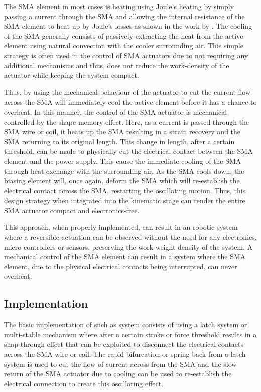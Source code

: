 The SMA element in most cases is heating using Joule's heating by simply passing a current through the SMA and allowing the internal resistance of the SMA element to heat up by Joule's losses as shown in the work by \todocite. The cooling of the SMA generally consists of passively extracting the heat from the active element using natural convection with the cooler surrounding air. This simple strategy is often used in the control of SMA actuators due to not requiring any additional mechanisms and thus, does not reduce the work-density of the actuator while keeping the system compact.

Thus, by using the mechanical behaviour of the actuator to cut the current flow across the SMA will immediately cool the active element before it has a chance to overheat. In this manner, the control of the SMA actuator is mechanical controlled by the shape memory effect. Here, as a current is passed through the SMA wire or coil, it heats up the SMA resulting in a strain recovery and the SMA returning to its original length. This change in length, after a certain threshold, can be made to physically cut the electrical contact between the SMA element and the power supply. This cause the immediate cooling of the SMA through heat exchange with the surrounding air. As the SMA cools down, the biasing element will, once again, deform the SMA which will re-establish the electrical contact across the SMA, restarting the oscillating motion. Thus, this design strategy when integrated into the kinematic stage can render the entire SMA actuator compact and electronics-free.

This approach, when properly implemented, can result in an robotic system where a reversible actuation can be observed without the need for any electronics, micro-controllers or sensors, preserving the work-weight density of the system. A mechanical control of the SMA element can result in a system where the SMA element, due to the physical electrical contacts being interrupted, can never overheat.

\subsection{Implementation}\label{sec:magnetic-latch}
The basic implementation of such as system consists of using a latch system or multi-stable mechanism where after a certain stroke or force threshold results in a snap-through effect that can be exploited to disconnect the electrical contacts across the SMA wire or coil. The rapid bifurcation or spring back from a latch system is used to cut the flow of current across from the SMA and the slow return of the SMA actuator due to cooling can be used to re-establish the electrical connection to create this oscillating effect.


